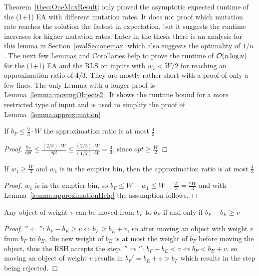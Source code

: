 Theorem~\ref{theo:OneMaxResult} only proved the asymptotic expected runtime of the (1+1) EA with different mutation rates.
It does not proof which mutation rate reaches the solution the fastest in expectation, but it suggests the runtime increases for higher mutation rates.
Later in the thesis there is an analysis for this lemma in Section~\ref{evalSec:onemax} which also suggests the optimality of $1/n$.\newline
The next few Lemmas and Corollaries help to prove the runtime of $\mathcal{O}(n\log{n})$ for the (1+1) EA and the RLS on inputs with $w_1<W/2$ for reaching an approximation ratio of 4/3.
They are mostly rather short with a proof of only a few lines.
The only Lemma with a longer proof is Lemma~\ref{lemma:movingObjects2}.
It shows the runtime bound for a more restricted type of input and is used to simplify the proof of Lemma~\ref{lemma:approximation}

\begin{lemma}\label{lemma:approximationHelp}
    If \(b_F \le \frac{2}{3} \cdot W\) the approximation ratio is at most $\frac{4}{3}$
\end{lemma}
\begin{proof}
    \(\frac{b_F}{opt} \le \frac{(2/3) \cdot W}{opt} \le \frac{(2/3) \cdot W}{(1/2) \cdot W} = \frac{4}{3}\), since \(opt \ge \frac{W}{2}\)
\end{proof}

\begin{corollary}\label{cor:approximationHelp}
    If \(w_1 \ge \frac{W}{3}\) and \(w_1\) is in the emptier bin, then the approximation ratio is at most $\frac{4}{3}$
\end{corollary}
\begin{proof}
    $w_1$ is in the emptier bin, so \( b_F \le W - w_1 \le W - \frac{W}{3} = \frac{2W}{3} \) and with Lemma~\ref{lemma:approximationHelp} the assumption follows.
\end{proof}

\begin{lemma}\label{lemma:movingObjects}
    Any object of weight $v$ can be moved from $b_F$ to $b_E$ if and only if \(b_F - b_E \ge v\)
\end{lemma}
\begin{proof}
    $''\Leftarrow''$:\newline
    \(b_F - b_E \ge v \Leftrightarrow b_F \ge b_E + v\), so after moving an object with weight $v$ from $b_F$ to $b_E$, the new weight of $b_E$ is at most the weight of $b_F$ before moving the object, thus the RSH accepts the step.\newline
    $''\Rightarrow''$:\newline
    \(b_F - b_E < v \Leftrightarrow b_F < b_E + v\), so moving an object of weight $v$ results in ${b_F}' = b_E+v > b_F$ which results in the step being rejected.
\end{proof}

